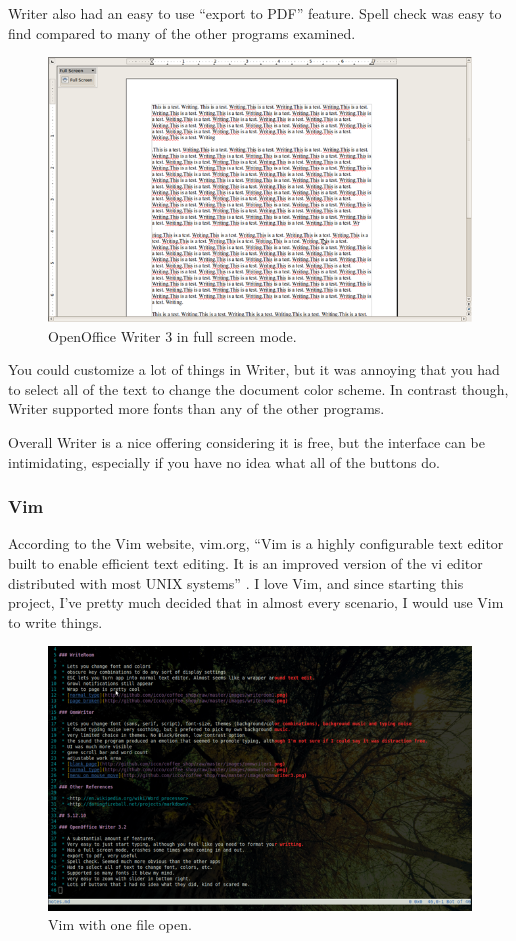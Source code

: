 \documentclass[10pt]{article}
\begin{document}
Writer also had an easy to use ``export to PDF'' feature. Spell check was easy to find compared to many of the other programs examined.

\begin{figure}
   \centering
      \includegraphics[width=130mm]{images/oo3.png}
   \caption{OpenOffice Writer 3 in full screen mode.}
\end{figure}

You could customize a lot of things in Writer, but it was annoying that you had to select all of the text to change the document color scheme. In contrast though, Writer supported more fonts than any of the other programs.

Overall Writer is a nice offering considering it is free, but the interface can be intimidating, especially if you have no idea what all of the buttons do.

\subsubsection{Vim}

According to the Vim website, vim.org, ``Vim is a highly configurable text editor built to enable efficient text editing. It is an improved version of the vi editor distributed with most UNIX systems'' \cite{vimabout}. I love Vim, and since starting this project, I've pretty much decided that in almost every scenario, I would use Vim to write things.

\begin{figure}
   \centering
      \includegraphics[width=130mm]{images/vim2.png}
   \caption{Vim with one file open.}
\end{figure}
\end{document}
